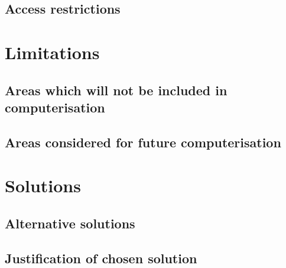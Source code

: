 \subsection{Access restrictions}

\section{Limitations}

\subsection{Areas which will not be included in computerisation}

\subsection{Areas considered for future computerisation}

\section{Solutions}

\subsection{Alternative solutions}

\subsection{Justification of chosen solution}
